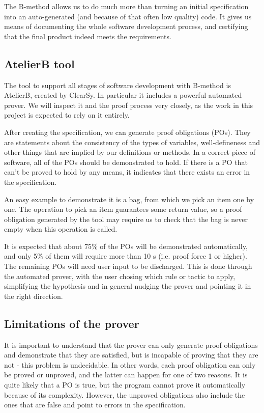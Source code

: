 \documentclass[11pt,journal]{IEEEtran}
\begin{document}
	The B-method allows us to do much more than turning an initial specification into an auto-generated (and because of that often low quality) code. It gives us means of documenting the whole software development process, and certifying that the final product indeed meets the requirements.
	
	\subsection{AtelierB tool}
	The tool to support all stages of software development with B-method is AtelierB, created by ClearSy. In particular it includes a powerful automated prover. We will inspect it and the proof process very closely, as the work in this project is expected to rely on it entirely.
	
	After creating the specification, we can generate proof obligations (POs). They are statements about the consistency of the types of variables, well-defineness and other things that are implied by our definitions or methods. In a correct piece of software, all of the POs should be demonstrated to hold. If there is a PO that can't be proved to hold by any means, it indicates that there exists an error in the specification.
	
	An easy example to demonstrate it is a bag, from which we pick an item one by one. The operation to pick an item guarantees some return value, so a proof obligation generated by the tool may require us to check that the bag is never empty when this operation is called.
	
	It is expected that about 75\% of the POs will be demonstrated automatically, and only 5\% of them will require more than 10 s (i.e. proof force 1 or higher)\cite{Prover guide}. The remaining POs will need user input to be discharged. This is done through the automated prover, with the user chosing which rule or tactic to apply, simplifying the hypothesis and in general nudging the prover and pointing it in the right direction.
	
	
	\subsection{Limitations of the prover}
	It is important to understand that the prover can only generate proof obligations and demonstrate that they are satisfied, but is incapable of proving that they are not - this problem is undecidable. In other words, each proof obligation can only be proved or unproved, and the latter can happen for one of two reasons. It is quite likely that a PO is true, but the program cannot prove it automatically because of its complexity. However, the unproved obligations also include the ones that are false and point to errors in the specification. 
	
\end{document}

